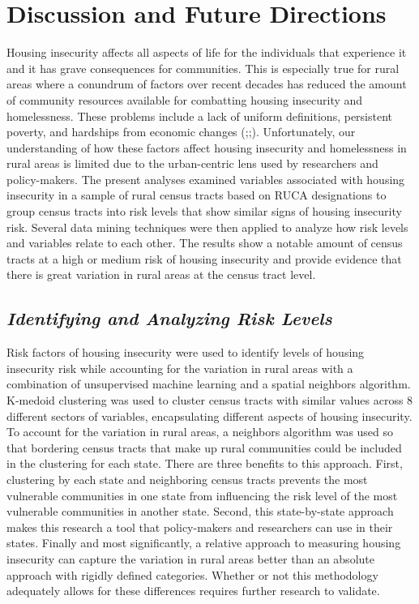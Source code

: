 \chapter{Discussion and Future Directions}	

Housing insecurity affects all aspects of life for the individuals that experience it and it has grave consequences for communities. This is especially true for rural areas where a conundrum of factors over recent decades has reduced the amount of community resources available for combatting housing insecurity and homelessness. These problems include a lack of uniform definitions, persistent poverty, and hardships from economic changes (\citealp{yousey_defining_2018};\citealp{crandall_local_2004};\citealp{pendall_future_2016}\citealp{kropczynski_insights_2012}). Unfortunately, our understanding of how these factors affect housing insecurity and homelessness in rural areas is limited due to the urban-centric lens used by researchers and policy-makers. The present analyses examined variables associated with housing insecurity in a sample of rural census tracts based on RUCA designations to group census tracts into risk levels that show similar signs of housing insecurity risk. Several data mining techniques were then applied to analyze how risk levels and variables relate to each other. The results show a notable amount of census tracts at a high or medium risk of housing insecurity and provide evidence that there is great variation in rural areas at the census tract level. 

\section{\textit{Identifying and Analyzing Risk Levels}}

Risk factors of housing insecurity were used to identify levels of housing insecurity risk while accounting for the variation in rural areas with a combination of unsupervised machine learning and a spatial neighbors algorithm. K-medoid clustering was used to cluster census tracts with similar values across 8 different sectors of variables, encapsulating different aspects of housing insecurity. To account for the variation in rural areas, a neighbors algorithm was used so that bordering census tracts that make up rural communities could be included in the clustering for each state. There are three benefits to this approach. First, clustering by each state and neighboring census tracts prevents the most vulnerable communities in one state from influencing the risk level of the most vulnerable communities in another state. Second, this state-by-state approach makes this research a tool that policy-makers and researchers can use in their states. Finally and most significantly, a relative approach to measuring housing insecurity can capture the variation in rural areas better than an absolute approach with rigidly defined categories. Whether or not this methodology adequately allows for these differences requires further research to validate.

